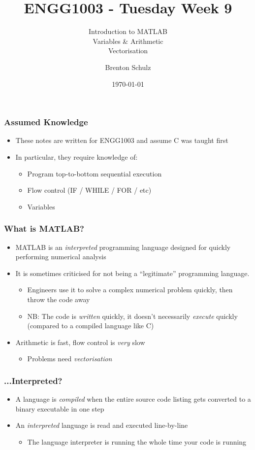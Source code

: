 \documentclass[14pt]{beamer}
\title{ENGG1003 - Tuesday Week 9}
\subtitle{Introduction to MATLAB\\Variables \& Arithmetic\\Vectorisation}
\author{Brenton Schulz}
\institute{University of Newcastle}
\date{\today}
\begin{document}
\titlepage

\begin{frame}
\frametitle{Assumed Knowledge}
\begin{itemize}
\item These notes are written for ENGG1003 and assume C was taught first
\item In particular, they require knowledge of:
	\begin{itemize}
		\item Program top-to-bottom sequential execution
		\item Flow control (IF / WHILE / FOR / etc)
		\item Variables
	\end{itemize}
\end{itemize}
\end{frame}

\begin{frame}
\frametitle{What is MATLAB?}
\begin{itemize}
\item MATLAB is an \textit{interpreted} programming language designed for quickly performing numerical analysis
\item It is sometimes criticised for not being a ``legitimate'' programming language.
	\begin{itemize}
		\item Engineers use it to solve a complex numerical problem quickly, then throw the code away
		\item NB: The code is \textit{written} quickly, it doesn't necessarily \textit{execute} quickly (compared to a compiled language like C)
	\end{itemize}
\item Arithmetic is fast, flow control is \textit{very} slow
\begin{itemize}
	\item Problems need \textit{vectorisation}
\end{itemize}
\end{itemize}
\end{frame}

\begin{frame}
\frametitle{...Interpreted?}
\begin{itemize}
\item A language is \textit{compiled} when the entire source code listing gets converted to a binary executable in one step
\item An \textit{interpreted} language is read and executed line-by-line
	\begin{itemize}
		\item The language interpreter is running the whole time your code is running
	\end{itemize}

\end{itemize}
\end{frame}
\end{document}
